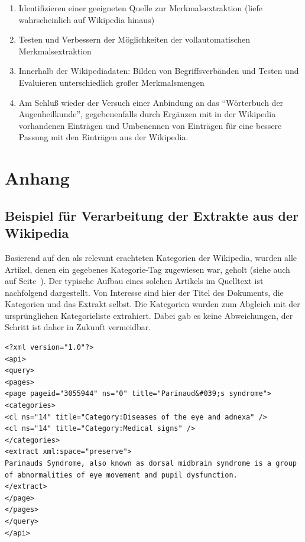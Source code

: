 \documentclass[pagesize,paper=A4,DIV=calc,fontsize=12pt,draft=false]{scrreprt}
\begin{document}
\begin{enumerate}
\item Identifizieren einer geeigneten Quelle zur Merkmalsextraktion (liefe wahrscheinlich auf Wikipedia hinaus)
\item Testen und Verbessern der Möglichkeiten der vollautomatischen Merkmalsextraktion
\item Innerhalb der Wikipediadaten: Bilden von Begriffsverbänden und Testen und Evaluieren unterschiedlich großer Merkmalsmengen
\item Am Schluß wieder der Versuch einer Anbindung an das \enquote{Wörterbuch der Augenheilkunde}, gegebenenfalls durch Ergänzen mit in der Wikipedia vorhandenen Einträgen und Umbenennen von Einträgen für eine bessere Passung mit den Einträgen aus der Wikipedia.
\end{enumerate}

\chapter{Anhang}

\section{Beispiel für Verarbeitung der Extrakte aus der Wikipedia}

Basierend auf den als relevant erachteten Kategorien der Wikipedia, wurden alle Artikel, denen ein gegebenes Kategorie-Tag zugewiesen war, geholt (siehe auch \emph{~} auf Seite~\pageref{subsec:wiki_cats}).
Der typische Aufbau eines solchen Artikels im Quelltext ist nachfolgend dargestellt.
Von Interesse sind hier der Titel des Dokuments, die Kategorien und das Extrakt selbst.
Die Kategorien wurden zum Abgleich mit der ursprünglichen Kategorieliste extrahiert.
Dabei gab es keine Abweichungen, der Schritt ist daher in Zukunft vermeidbar. 

\lstset{
language=XML
}

\begin{lstlisting}[caption={XML-Quelltext eines typischen Artikels der Wikipedia: \enquote{Parinaud's syndrome}}]
<?xml version="1.0"?>
<api>
<query>
<pages>
<page pageid="3055944" ns="0" title="Parinaud&#039;s syndrome">
<categories>
<cl ns="14" title="Category:Diseases of the eye and adnexa" />
<cl ns="14" title="Category:Medical signs" />
</categories>
<extract xml:space="preserve">
Parinauds Syndrome, also known as dorsal midbrain syndrome is a group of abnormalities of eye movement and pupil dysfunction.
</extract>
</page>
</pages>
</query>
</api>
\end{lstlisting}
\end{document}
